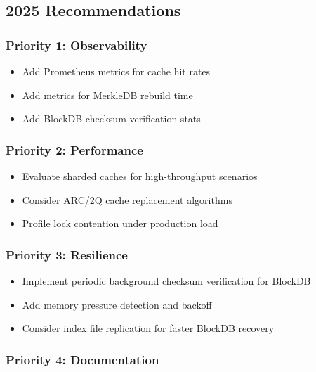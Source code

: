 \documentclass[
]{article}
\providecommand{\tightlist}{%
  \setlength{\itemsep}{0pt}\setlength{\parskip}{0pt}}
\begin{document}
\subsection{2025 Recommendations}\label{2025-recommendations}

\subsubsection{Priority 1:
Observability}\label{priority-1-observability}

\begin{itemize}
\tightlist
\item[$\square$]
  Add Prometheus metrics for cache hit rates
\item[$\square$]
  Add metrics for MerkleDB rebuild time
\item[$\square$]
  Add BlockDB checksum verification stats
\end{itemize}

\subsubsection{Priority 2: Performance}\label{priority-2-performance}

\begin{itemize}
\tightlist
\item[$\square$]
  Evaluate sharded caches for high-throughput scenarios
\item[$\square$]
  Consider ARC/2Q cache replacement algorithms
\item[$\square$]
  Profile lock contention under production load
\end{itemize}

\subsubsection{Priority 3: Resilience}\label{priority-3-resilience}

\begin{itemize}
\tightlist
\item[$\square$]
  Implement periodic background checksum verification for BlockDB
\item[$\square$]
  Add memory pressure detection and backoff
\item[$\square$]
  Consider index file replication for faster BlockDB recovery
\end{itemize}

\subsubsection{Priority 4:
Documentation}\label{priority-4-documentation}
\end{document}
